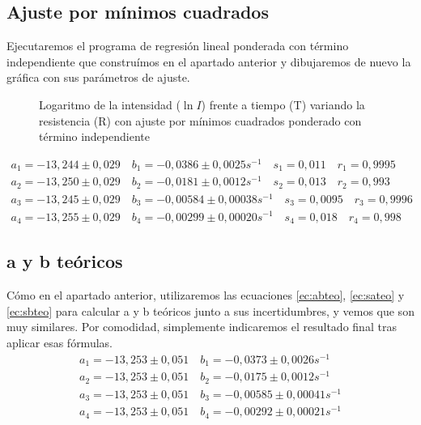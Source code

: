 \documentclass[12pt, a4paper, titlepage]{article}
\begin{document}
  \subsection{Ajuste por mínimos cuadrados}

  Ejecutaremos el programa de regresión lineal ponderada con término independiente que construímos en el apartado anterior y dibujaremos de nuevo la gráfica con sus parámetros de ajuste.

  \begin{figure}[H]
    \hspace{0.2em} 
    \caption{Logaritmo de la intensidad ($\ln{I}$) frente a tiempo (T) variando la resistencia (R) con ajuste por mínimos cuadrados ponderado con término independiente}
  \end{figure} \vspace{0cm}
  \begin{gather*}
    a_1 = -13,244 \pm 0,029 \quad b_1 = -0,0386 \pm 0,0025 s^{-1} \quad s_1 = 0,011 \quad r_1 = 0,9995 \\
    a_2 = -13,250 \pm 0,029 \quad b_2 = -0,0181 \pm 0,0012 s^{-1} \quad s_2 = 0,013 \quad r_2 = 0,993 \\
    a_3 = -13,245 \pm 0,029 \quad b_3 = -0,00584 \pm 0,00038 s^{-1} \quad s_3 = 0,0095 \quad r_3 = 0,9996 \\
    a_4 = -13,255 \pm 0,029 \quad b_4 = -0,00299 \pm 0,00020 s^{-1} \quad s_4 = 0,018 \quad r_4 = 0,998
  \end{gather*}

  \subsection{a y b teóricos}

  Cómo en el apartado anterior, utilizaremos las ecuaciones \ref{ec:abteo}, \ref{ec:sateo} y \ref{ec:sbteo} para calcular a y b teóricos junto a sus incertidumbres, y vemos que son muy similares. Por comodidad, simplemente indicaremos el resultado final tras aplicar esas fórmulas.
  \begin{gather*}
    a_1 = -13,253 \pm 0,051 \quad b_1 = -0,0373 \pm 0,0026 s^{-1} \\
    a_2 = -13,253 \pm 0,051 \quad b_2 = -0,0175 \pm 0,0012 s^{-1} \\
    a_3 = -13,253 \pm 0,051 \quad b_3 = -0,00585 \pm 0,00041 s^{-1} \\
    a_4 = -13,253 \pm 0,051 \quad b_4 = -0,00292 \pm 0,00021 s^{-1}
  \end{gather*}
\end{document}
